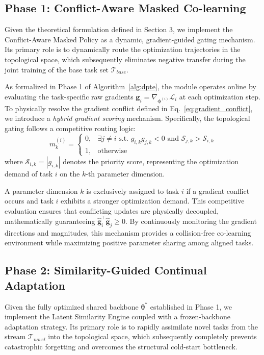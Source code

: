 \documentclass{article}
\begin{document}
\subsection{Phase 1: Conflict-Aware Masked Co-learning}

Given the theoretical formulation defined in Section 3, we implement the Conflict-Aware Masked Policy as a dynamic, gradient-guided gating mechanism.
Its primary role is to dynamically route the optimization trajectories in the topological space, which subsequently eliminates negative transfer during the joint training of the base task set $\mathcal{T}_{base}$.


As formalized in Phase 1 of Algorithm~\ref{alg:dpte}, the module operates online by evaluating the task-specific raw gradients $\bm{g}_i = \nabla_{\bm{\phi}^{(i)}} \mathcal{L}_i$ at each optimization step. 
To physically resolve the gradient conflict defined in Eq.~\ref{eq:gradient_conflict}, we introduce a \emph{hybrid gradient scoring} mechanism.
Specifically, the topological gating follows a competitive routing logic:
\begin{equation}
m_k^{(i)} = 
\begin{cases} 
0, & \exists j \neq i \text{ s.t. } g_{i,k} g_{j,k} < 0 \text{ and } \mathcal{S}_{j,k} > \mathcal{S}_{i,k} \\ 
1, & \text{otherwise} 
\end{cases}
\label{eq:mask_routing}
\end{equation}
where $\mathcal{S}_{i,k} = |g_{i,k}|$ denotes the priority score, representing the optimization demand of task $i$ on the $k$-th parameter dimension.


A parameter dimension $k$ is exclusively assigned to task $i$ if a gradient conflict occurs and task $i$ exhibits a stronger optimization demand. 
This competitive evaluation ensures that conflicting updates are physically decoupled, mathematically guaranteeing $\hat{\bm{g}}_i^\top \hat{\bm{g}}_j \ge 0$. 
By continuously monitoring the gradient directions and magnitudes, this mechanism provides a collision-free co-learning environment while maximizing positive parameter sharing among aligned tasks.

\subsection{Phase 2: Similarity-Guided Continual Adaptation}

Given the fully optimized shared backbone $\bm{\theta}^*$ established in Phase 1, we implement the Latent Similarity Engine coupled with a frozen-backbone adaptation strategy.
Its primary role is to rapidly assimilate novel tasks from the stream $\mathcal{T}_{novel}$ into the topological space, which subsequently completely prevents catastrophic forgetting and overcomes the structural cold-start bottleneck.
\end{document}
